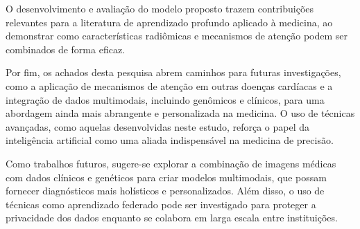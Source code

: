 O desenvolvimento e avaliação do modelo proposto trazem contribuições relevantes para a literatura de aprendizado profundo aplicado à medicina, ao demonstrar como características radiômicas e mecanismos de atenção podem ser combinados de forma eficaz. 

Por fim, os achados desta pesquisa abrem caminhos para futuras investigações, como a aplicação de mecanismos de atenção em outras doenças cardíacas e a integração de dados multimodais, incluindo genômicos e clínicos, para uma abordagem ainda mais abrangente e personalizada na medicina. O uso de técnicas avançadas, como aquelas desenvolvidas neste estudo, reforça o papel da inteligência artificial como uma aliada indispensável na medicina de precisão.

Como trabalhos futuros, sugere-se explorar a combinação de imagens médicas com dados clínicos e genéticos para criar modelos multimodais, que possam fornecer diagnósticos mais holísticos e personalizados. Além disso, o uso de técnicas como aprendizado federado pode ser investigado para proteger a privacidade dos dados enquanto se colabora em larga escala entre instituições.



